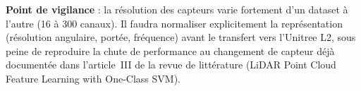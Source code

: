 \documentclass[11pt]{article}
\begin{document}
\textbf{Point de vigilance} : la résolution des capteurs varie fortement d'un dataset à
l'autre (16 à 300 canaux). Il faudra normaliser explicitement la représentation (résolution
angulaire, portée, fréquence) avant le transfert vers l'Unitree L2, sous peine de reproduire
la chute de performance au changement de capteur déjà documentée dans l'article~III de la
revue de littérature (LiDAR Point Cloud Feature Learning with One-Class SVM).
\end{document}
